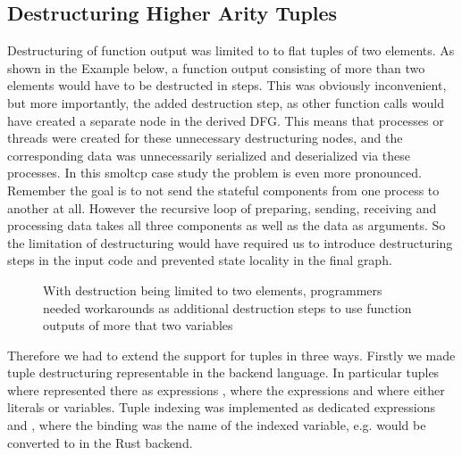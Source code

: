 \subsection{Destructuring Higher Arity Tuples}

Destructuring of function output was limited to to flat tuples of two elements. As shown in the Example below, a function output consisting of more than two elements would have to be destructed in steps. This was obviously inconvenient, but more importantly, the added destruction step, as other function calls would have created a separate node in the derived DFG. This means that processes or threads were created for these unnecessary destructuring nodes, and the corresponding data was unnecessarily serialized and deserialized via these processes. In this smoltcp case study the problem is even more pronounced. Remember the goal is to not send the stateful components from one process to another at all. However the recursive loop of preparing, sending, receiving and processing data takes all three components as well as the data as arguments. So the limitation of destructuring would have required us to introduce destructuring steps in the input code and prevented state locality in the final graph. 
\begin{figure}[H]
\centering
\tabskip=0pt
\caption{With destruction being limited to two elements, programmers needed workarounds as additional destruction steps to use function outputs of more that two variables}
\label{fig:DetructExample}
\end{figure}

Therefore we had to extend the support for tuples in three ways. 
Firstly we made tuple destructuring representable in the backend language. In particular tuples where represented there as expressions , where the expressions  and  where either literals or variables. Tuple indexing was implemented as dedicated expressions  and , where the binding  was the name of the indexed variable, e.g.  would be converted to  in the Rust backend.\\

